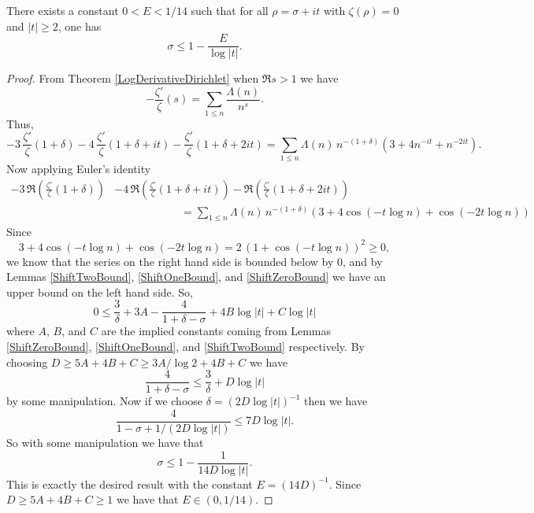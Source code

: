\begin{theorem}[ZeroInequality]
\label{ZeroInequality}
\leanok
There exists a constant $0 < E<1/14$ such that for all $\rho=\sigma+it$ with $\zeta(\rho)=0$
    and $|t|\geq 2$, one has
    $$\sigma\leq 1-\frac{E}{\log|t|}.$$
\end{theorem}
\begin{proof}
\leanok
From Theorem \ref{LogDerivativeDirichlet} when $\Re s>1$ we have
    $$-\frac{\zeta'}{\zeta}(s)=\sum_{1\leq n}\frac{\Lambda(n)}{n^s}.$$
    Thus,
    $$-3\,\frac{\zeta'}{\zeta}(1+\delta)
        -4\,\frac{\zeta'}{\zeta}(1+\delta+it)
        -\frac{\zeta'}{\zeta}(1+\delta+2it)
        =\sum_{1\leq n}\Lambda(n)\,n^{-(1+\delta)}\left(3+4n^{-it}+n^{-2it}\right).$$
    Now applying Euler's identity
    \begin{align*}
        -3\,\Re \left(\frac{\zeta'}{\zeta}(1+\delta)\right)&
            -4\,\Re \left(\frac{\zeta'}{\zeta}(1+\delta+it)\right)
            -\Re \left(\frac{\zeta'}{\zeta}(1+\delta+2it)\right) \\
        &\qquad\qquad\qquad=\sum_{1\leq n}\Lambda(n)\,n^{-(1+\delta)}
            \left(3+4\cos(-t\log n)+\cos(-2t\log n)\right)
    \end{align*}
    Since
    $$3+4\cos(-t\log n)+\cos(-2t\log n)=2\,(1+\cos(-t\log n))^2\geq 0,$$
    we know that the series on the right hand side is bounded below by $0$,
    and by Lemmas \ref{ShiftTwoBound}, \ref{ShiftOneBound}, and \ref{ShiftZeroBound}
    we have an upper bound on the left hand side. So,
    $$0\leq\frac{3}{\delta}+3A-\frac{4}{1+\delta-\sigma}+4B\log|t|+C\log|t|$$
    where $A$, $B$, and $C$ are the implied constants coming from Lemmas
    \ref{ShiftZeroBound}, \ref{ShiftOneBound}, and \ref{ShiftTwoBound} respectively.
    By choosing $D\geq 5A+4B+C\geq 3A/\log 2+4B+C$ we have
    $$\frac{4}{1+\delta-\sigma}\leq\frac{3}{\delta}+D\log|t|$$
    by some manipulation. Now if we choose $\delta=(2D\log|t|)^{-1}$ then we have
    $$\frac{4}{1-\sigma+1/(2D\log|t|)}\leq7D\log|t|.$$
    So with some manipulation we have that
    $$\sigma\leq 1-\frac{1}{14D\log|t|}.$$
    This is exactly the desired result with the constant $E=(14D)^{-1}$. Since
    $D\geq 5A+4B+C\geq 1$ we have that $E\in(0,1/14)$.
\end{proof}
